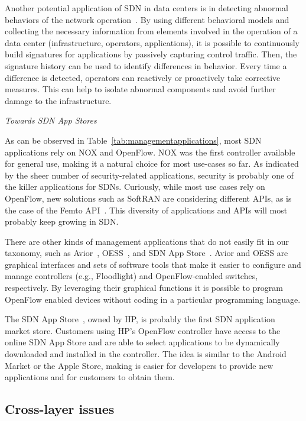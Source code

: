Another potential application of SDN in data centers is in detecting abnormal behaviors of the network 
operation~\cite{arefin2013}. By using different behavioral models and collecting the necessary 
information from elements involved in the operation of a data center (infrastructure, operators, applications), 
it is possible to continuously build signatures for applications by passively capturing control traffic.
Then, the signature history can be used to identify differences in behavior.
Every time a difference is detected, operators can reactively or proactively take corrective measures.
This can help to isolate abnormal components and avoid further damage to the
infrastructure.

\vspace{2mm}
\noindent \textit{Towards SDN App Stores}

As can be observed in Table~\ref{tab:managementapplications}, most SDN applications rely on NOX and OpenFlow.
NOX was the first controller available for general use, making it a natural choice for most use-cases so far.
As indicated by the sheer number of security-related applications, security is probably one of the killer 
applications for SDNs. Curiously, while most use cases rely on OpenFlow, new solutions such as SoftRAN are 
considering different APIs, as is the case of the Femto API~\cite{smallcellforum2013,Chandrasekhar2008}. This diversity of 
applications and APIs will most probably keep growing in SDN.

There are other kinds of management applications that do not easily fit in our taxonomy, such as Avior~\cite{parraga2013}, OESS~\cite{globalnoc2013}, and SDN App Store~\cite{duckett2013,hp2013-2}.
Avior and OESS are graphical interfaces and sets of software tools that make it easier to configure and manage controllers (e.g., Floodlight) and OpenFlow-enabled switches, respectively.
By leveraging their graphical functions it is possible to program OpenFlow enabled devices without coding in a particular programming language.

The SDN App Store~\cite{duckett2013,hp2013-2}, owned by HP, is probably the first SDN 
application market store. Customers using HP's OpenFlow controller have access to the online SDN App Store 
and are able to select applications to be dynamically downloaded and installed in the controller. 
The idea is similar to the Android Market or the Apple Store, making is easier for developers to provide 
new applications and for customers to obtain them.

\subsection{Cross-layer issues}
\label{sec:debuggingandtroubleshooting}

